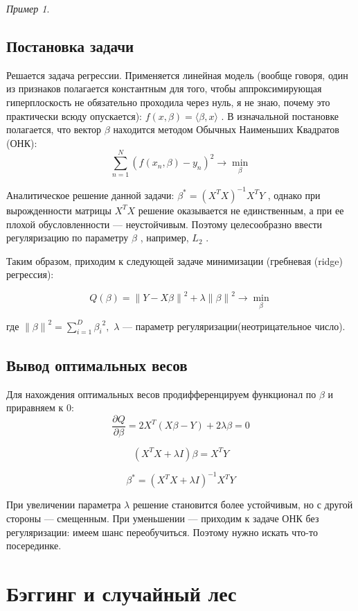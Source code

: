 \documentclass[a4paper, 12pt]{article}
\theoremstyle{plain} %
\theoremstyle{definition} %
\theoremstyle{remark} %
\newtheorem{example}{Пример}
\begin{document}
\begin{example}
\subsection{Постановка задачи}

Решается задача регрессии. Применяется линейная модель (вообще говоря, один из признаков полагается константным для того, чтобы аппроксимирующая гиперплоскость не обязательно проходила через нуль, я не знаю, почему это практически всюду опускается): $  f(x, \beta) = \langle\beta, x\rangle  $
. В изначальной постановке полагается, что вектор $\beta$
 находится методом Обычных Наименьших Квадратов (ОНК):
 \[
 	\sum_{n = 1}^{N} (f(x_n, \beta) - y_n)^2 \longrightarrow \min_{\displaystyle \beta}
\]


Аналитическое решение данной задачи: $  \beta^{*} = (X^TX)^{-1}X^TY  $
, однако при вырожденности матрицы $  X^TX  $
 решение оказывается не единственным, а при ее плохой обусловленности — неустойчивым. Поэтому целесообразно ввести регуляризацию по параметру $  \beta  $
, например, $  L_2  $
.

Таким образом, приходим к следующей задаче минимизации (гребневая (ridge) регрессия):

\[
	Q(\beta)= \left \| Y - X\beta \right \|^2 + \lambda\left \|\beta \right \|^2 \longrightarrow \min_{\displaystyle \beta}
\]


где $ \left \|\beta \right \|^2 =\sum^{D}_{i=1} {\beta_i}^2,   $
 $  \lambda   $
 — параметр регуляризации(неотрицательное число).

\subsection{Вывод оптимальных весов}

Для нахождения оптимальных весов продифференцируем функционал по $ \beta  $
 и приравняем к 0:
 \[
 	\frac{\partial Q}{\partial \beta} = 2X^{T}(X\beta - Y) + 2\lambda\beta = 0
\]


\[
	(X^{T}X + \lambda I)\beta = X^{T}Y
\]


\[
	\beta^{*} =(X^{T}X + \lambda I)^{-1} X^{T}Y
\]

При увеличении параметра $  \lambda  $
 решение становится более устойчивым, но с другой стороны — смещенным. При уменьшении — приходим к задаче ОНК без регуляризации: имеем шанс переобучиться. Поэтому нужно искать что-то посерединке.

\section{Бэггинг и случайный лес}


\end{example}
\end{document}
